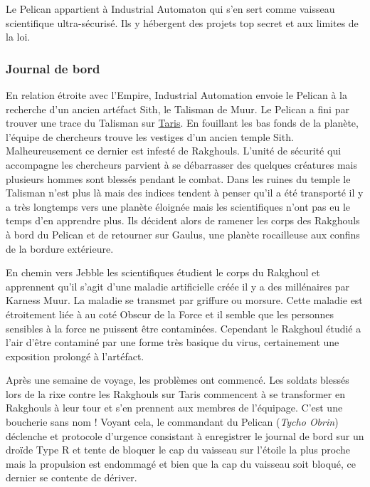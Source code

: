 Le Pelican appartient à Industrial Automaton qui s’en sert comme vaisseau scientifique ultra-sécurisé. Ils y hébergent des projets top secret et aux limites de la loi.

\subsubsection{Journal de bord}
\label{sec:pelican-jdb}
En relation étroite avec l’Empire, Industrial Automation envoie le Pelican à la recherche d’un ancien artéfact Sith, le Talisman de Muur. Le Pelican a fini par trouver une trace du Talisman sur \href{http://fr.starwars.wikia.com/wiki/Taris}{Taris}. En fouillant les bas fonds de la planète, l’équipe de chercheurs trouve les vestiges d'un ancien temple Sith. Malheureusement ce dernier est infesté de Rakghouls. L’unité de sécurité qui accompagne les chercheurs parvient à se débarrasser des quelques créatures mais plusieurs hommes sont blessés pendant le combat. Dans les ruines du temple le Talisman n’est plus là mais des indices tendent à penser qu’il a été transporté il y a très longtemps vers une planète éloignée mais les scientifiques n'ont pas eu le temps d'en apprendre plus. Ils décident alors de ramener les corps des Rakghouls à bord du Pelican et de retourner sur Gaulus, une planète rocailleuse aux confins de la bordure extérieure.

En chemin vers Jebble les scientifiques étudient le corps du Rakghoul et apprennent qu’il s’agit d’une maladie artificielle créée il y a des millénaires par Karness Muur. La maladie se transmet par griffure ou morsure. Cette maladie est étroitement liée à au coté Obscur de la Force et il semble que les personnes sensibles à la force ne puissent être contaminées. Cependant le Rakghoul étudié a l’air d’être contaminé par une forme très basique du virus, certainement une exposition prolongé à l’artéfact.

Après une semaine de voyage, les problèmes ont commencé. Les soldats blessés lors de la rixe contre les Rakghouls sur Taris commencent à se transformer en Rakghouls à leur tour et s’en prennent aux membres de l’équipage. C’est une boucherie sans nom ! Voyant cela, le commandant du Pelican (\emph{Tycho Obrin}) déclenche et protocole d’urgence consistant à enregistrer le journal de bord sur un droïde Type R et tente de bloquer le cap du vaisseau sur l’étoile la plus proche mais la propulsion est endommagé et bien que la cap du vaisseau soit bloqué, ce dernier se contente de dériver.

\vspace{10\baselineskip}
